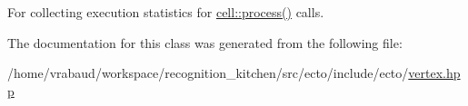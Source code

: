 For collecting execution statistics for \hyperlink{structecto_1_1cell_a6b810671ee21f5dddbc1206abfb999f3}{cell\+::process()} calls. 



The documentation for this class was generated from the following file\+:\begin{DoxyCompactItemize}
\item 
/home/vrabaud/workspace/recognition\+\_\+kitchen/src/ecto/include/ecto/\hyperlink{vertex_8hpp}{vertex.\+hpp}\end{DoxyCompactItemize}
